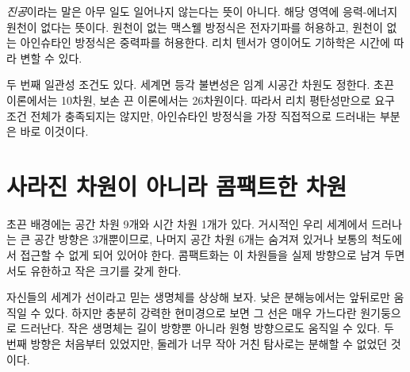 \emph{진공}이라는 말은 아무 일도 일어나지 않는다는 뜻이 아니다. 해당 영역에 응력-에너지 원천이 없다는 뜻이다. 원천이 없는 맥스웰 방정식은 전자기파를 허용하고, 원천이 없는 아인슈타인 방정식은 중력파를 허용한다. 리치 텐서가 영이어도 기하학은 시간에 따라 변할 수 있다.

\begin{classroomqa}\end{classroomqa}

두 번째 일관성 조건도 있다. 세계면 등각 불변성은 임계 시공간 차원도 정한다. 초끈 이론에서는 10차원, 보손 끈 이론에서는 26차원이다. 따라서 리치 평탄성만으로 요구 조건 전체가 충족되지는 않지만, 아인슈타인 방정식을 가장 직접적으로 드러내는 부분은 바로 이것이다.

\section{사라진 차원이 아니라 콤팩트한 차원}

초끈 배경에는 공간 차원 9개와 시간 차원 1개가 있다. 거시적인 우리 세계에서 드러나는 큰 공간 방향은 3개뿐이므로, 나머지 공간 차원 6개는 숨겨져 있거나 보통의 척도에서 접근할 수 없게 되어 있어야 한다. 콤팩트화는 이 차원들을 실제 방향으로 남겨 두면서도 유한하고 작은 크기를 갖게 한다.

\begin{classroomqa}\end{classroomqa}

자신들의 세계가 선이라고 믿는 생명체를 상상해 보자. 낮은 분해능에서는 앞뒤로만 움직일 수 있다. 하지만 충분히 강력한 현미경으로 보면 그 선은 매우 가느다란 원기둥으로 드러난다. 작은 생명체는 길이 방향뿐 아니라 원형 방향으로도 움직일 수 있다. 두 번째 방향은 처음부터 있었지만, 둘레가 너무 작아 거친 탐사로는 분해할 수 없었던 것이다.

